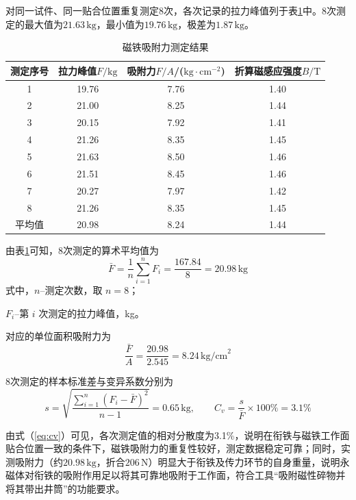 对同一试件、同一贴合位置重复测定8次，各次记录的拉力峰值列于表\ref{tab:magnet_adsorption_force}中。8次测定的最大值为$21.63\,\text{kg}$，最小值为$19.76\,\text{kg}$，极差为$1.87\,\text{kg}$。

\begin{table}[htbp]
	\centering
	\caption{磁铁吸附力测定结果}
	\label{tab:magnet_adsorption_force}
	\renewcommand{\arraystretch}{1.3}
	\begin{tabular}{cccc}
		\toprule
		测定序号 & 拉力峰值$F/\text{kg}$ & 吸附力$F/A$/($\text{kg}\cdot\text{cm}^{-2}$) & 折算磁感应强度$B/\text{T}$ \\
		\midrule
		1 & 19.76 & 7.76 & 1.40 \\
		2 & 21.00 & 8.25 & 1.44 \\
		3 & 20.15 & 7.92 & 1.41 \\
		4 & 21.26 & 8.35 & 1.45 \\
		5 & 21.63 & 8.50 & 1.46 \\
		6 & 21.51 & 8.45 & 1.46 \\
		7 & 20.27 & 7.97 & 1.42 \\
		8 & 21.26 & 8.35 & 1.45 \\
		\midrule
		平均值 & 20.98 & 8.24 & 1.44 \\
		\bottomrule
	\end{tabular}
\end{table}

由表\ref{tab:magnet_adsorption_force}可知，8次测定的算术平均值为
\begin{equation}
	\bar F=\frac{1}{n}\sum_{i=1}^{n}F_i=\frac{167.84}{8}=20.98\,\text{kg}
\end{equation}
式中，$n$--测定次数，取 $n=8$；

$F_i$--第 $i$ 次测定的拉力峰值，kg。

对应的单位面积吸附力为
\begin{equation}
	\frac{\bar F}{A}=\frac{20.98}{2.545}=8.24\,\text{kg/cm}^2
\end{equation}

8次测定的样本标准差与变异系数分别为
\begin{equation}
	s=\sqrt{\frac{\sum_{i=1}^{n}(F_i-\bar F)^2}{n-1}}=0.65\,\text{kg},\qquad
	C_v=\frac{s}{\bar F}\times 100\%=3.1\%
	\label{eq:cv}
\end{equation}

由式（\ref{eq:cv}）可见，各次测定值的相对分散度为3.1\%，说明在衔铁与磁铁工作面贴合位置一致的条件下，磁铁吸附力的重复性较好，测定数据稳定可靠；同时，实测吸附力（约$20.98\,\text{kg}$，折合$206\,\text{N}$）明显大于衔铁及传力环节的自身重量，说明永磁体对衔铁的吸附作用足以将其可靠地吸附于工作面，符合工具“吸附磁性碎物并将其带出井筒”的功能要求。

